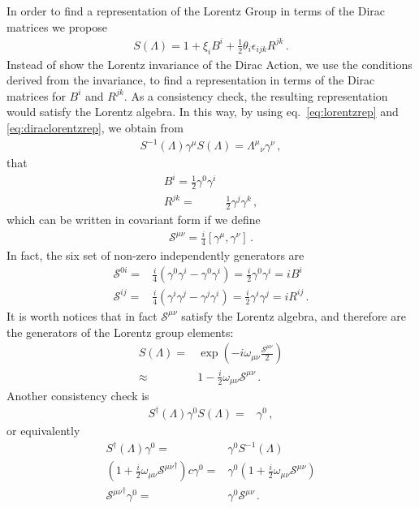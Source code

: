 In order to find a representation of the Lorentz Group in terms of the Dirac matrices we propose
  \begin{align}
    \label{eq:diraclorentzrep}
  S(\Lambda)=1+\xi_iB^i+\frac{1}{2}\theta_i\epsilon_{i j k}R^{jk}\,.
\end{align}
Instead of show the Lorentz invariance of the Dirac Action, we use the conditions derived from the invariance, to find a representation in terms of the Dirac matrices for $B^i$ and $R^{jk}$. As a consistency check, the resulting representation would satisfy the Lorentz algebra. In this way, by using eq.~\eqref{eq:lorentzrep} and \eqref{eq:diraclorentzrep}, we obtain from 
\begin{align}
  S^{-1}(\Lambda)\gamma^\mu S(\Lambda)={\Lambda^\mu}_\nu\gamma^\nu\,,
\end{align}
that
\begin{align}
  B^i=\frac{1}{2}\gamma^0\gamma^i\nonumber\\
  R^{jk}=&\frac{1}{2}\gamma^j\gamma^k\,,
\end{align}
which can be written in covariant form if we define
\begin{align}
  \mathcal{S}^{\mu\nu}=\frac{i}{4}\left[\gamma^\mu,\gamma^\nu\right]\,.
\end{align}
In fact, the six set of non-zero independently generators are
\begin{align}
  \mathcal{S}^{0i}=&\frac{i}{4}\left(\gamma^0\gamma^i-\gamma^0\gamma^i\right)=\frac{i}{2}\gamma^0\gamma^i= i B^i\nonumber\\
  \mathcal{S}^{i j}=&\frac{i}{4}\left(\gamma^i\gamma^j-\gamma^j\gamma^i\right)=\frac{i}{2}\gamma^i\gamma^j= i R^{i j}\,.
\end{align}
It is worth notices that in fact $\mathcal{S}^{\mu\nu}$ satisfy the Lorentz algebra, and therefore are the generators of the Lorentz group elements:
\begin{align}
  S(\Lambda)=&\exp\left(-i \omega_{\mu\nu}\frac{\mathcal{S}^{\mu\nu}}{2}\right)\nonumber\\
  \approx&1-\frac{i}{2} \omega_{\mu\nu}{\mathcal{S}^{\mu\nu}}\,.
\end{align}
Another consistency check is
\begin{align}
  S^\dagger(\Lambda)\gamma^0S(\Lambda)=&\gamma^0\,,
\end{align}
or equivalently
\begin{align}
S^\dagger(\Lambda)\gamma^0=&\gamma^0S^{-1}(\Lambda)\nonumber\\
\left(1+\frac{i}{2} \omega_{\mu\nu}{\mathcal{S}^{\mu\nu}}^\dagger \right)c\gamma^0=&\gamma^0\left(1+\frac{i}{2} \omega_{\mu\nu}{\mathcal{S}^{\mu\nu}}\right)\nonumber\\
{\mathcal{S}^{\mu\nu}}^\dagger \gamma^0=&\gamma^0{\mathcal{S}^{\mu\nu}}\,.
\end{align}
